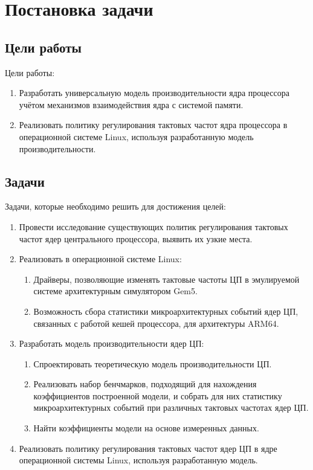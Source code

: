 \section{Постановка задачи}
\label{sec:Section1} 

\subsection{Цели работы}

    Цели работы:
    \begin{enumerate}
        \item Разработать универсальную модель производительности ядра процессора учётом
        механизмов взаимодействия ядра с системой памяти.
        \item Реализовать политику регулирования тактовых частот ядра процессора в операционной
        системе Linux, используя разработанную модель производительности.
    \end{enumerate}

\subsection{Задачи}

    Задачи, которые необходимо решить для достижения целей:
    \begin{enumerate}
        \item Провести исследование существующих политик регулирования тактовых частот ядер центрального
        процессора, выявить их узкие места.
        \item Реализовать в операционной системе Linux:
        \begin{enumerate}
            \item Драйверы, позволяющие изменять тактовые частоты ЦП в эмулируемой системе
            архитектурным симулятором Gem5.
            \item Возможность сбора статистики микроархитектурных событий ядер ЦП, связанных с работой
            кешей процессора, для архитектуры ARM64.
        \end{enumerate}
        \item Разработать модель производительности ядер ЦП:
        \begin{enumerate}
            \item Спроектировать теоретическую модель производительности ЦП.
            \item Реализовать набор бенчмарков, подходящий для нахождения коэффициентов
                построенной модели, и собрать для них статистику микроархитектурных событий при
                различных тактовых частотах ядер ЦП.
            \item Найти коэффициенты модели на основе измеренных данных.
        \end{enumerate}
        \item Реализовать политику регулирования тактовых частот ядер ЦП в ядре операционной системы
            Linux, используя разработанную модель.
    \end{enumerate}
\newpage

